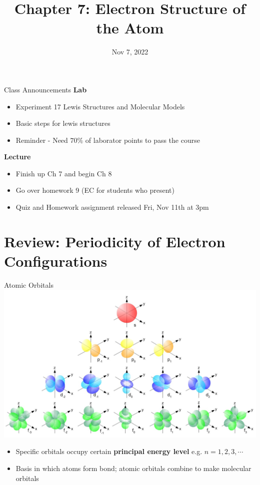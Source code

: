 \documentclass[11pt]{beamer}
\title{Chapter 7: Electron Structure of the Atom}
\institute{Chemistry Department, Cypress College}
\date{Nov 7, 2022}
\begin{document}
\begin{frame}
  \titlepage
\end{frame}

\begin{frame}{Class Announcements}
  \textbf{Lab}
  \begin{itemize}
  \item Experiment 17 Lewis Structures and Molecular Models
  \item Basic steps for lewis structures
  \item Reminder - Need $70\%$ of laborator points to pass
    the course
  \end{itemize}

  \textbf{Lecture}
  \begin{itemize}
  \item Finish up Ch 7 and begin Ch 8
  \item Go over homework 9 (EC for students who present)
  \item Quiz and Homework assignment released Fri, Nov 11th at 3pm
  \end{itemize}
\end{frame}

\section{Review: Periodicity of Electron Configurations}

\begin{frame}{Atomic Orbitals}
  \centering
  \includegraphics[width=0.8\linewidth]{single_elect_orb}
  \begin{itemize}
  \item Specific orbitals occupy certain \textbf{principal energy level} e.g.
    $n = 1, 2, 3, \cdots$
  \item Basis in which atoms form bond; atomic orbitals combine to make
    molecular orbitals
  \end{itemize}
\end{frame}
\end{document}
